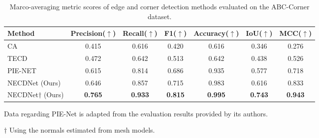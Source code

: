 \documentclass[lettersize,journal]{IEEEtran}
\begin{document}
\begin{table}[ht]
    \centering
    \small
    \setlength{\tabcolsep}{17.6pt}
    \begin{threeparttable}
    \caption{Marco-averaging metric scores of edge and corner detection methods evaluated on the ABC-Corner dataset.}
    \label{tab:corner_result}
    \begin{tabular}{lcccccc}
        \toprule
        Method & Precision($\uparrow$) & Recall($\uparrow$) & F1($\uparrow$) & Accuracy($\uparrow$) & IoU($\uparrow$) & MCC($\uparrow$) \\
        \midrule
        CA~\cite{bazazian_fast_2015} & 0.415 & 0.616 & 0.420 & 0.616 & 0.346 & 0.276 \\
        TECD~\cite{ahmed_edge_2018} & 0.472 & 0.642 & 0.513 & 0.642 & 0.438 & 0.526 \\
        PIE-NET~\cite{wang_pienet_2020a} & 0.615 & 0.814 & 0.686 & 0.935 & 0.577 & 0.718 \\
        NECDNet (Ours)  & 0.646 & 0.857 & 0.715 & 0.983 & 0.616 & 0.833 \\
        NECDNet$\dagger$ (Ours)  & \textbf{0.765} & \textbf{0.933} & \textbf{0.815} & \textbf{0.995} & \textbf{0.743} & \textbf{0.943} \\
        \bottomrule
    \end{tabular}
    \begin{tablenotes}
        \footnotesize
        Data regarding PIE-Net is adapted from the evaluation results provided by its authors.
        
        $\dagger$ Using the normals estimated from mesh models. 
     \end{tablenotes}
    
    \end{threeparttable}
    
\end{table}
\end{document}
